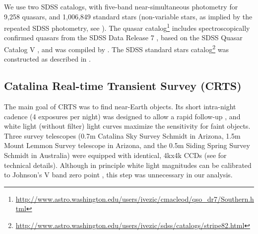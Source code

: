 \documentclass[fleqn,usenatbib]{mnras}
\begin{document}
We use two SDSS catalogs, with five-band near-simultaneous photometry for 9,258  quasars,  and 1,006,849 standard stars
(non-variable stars, as implied by the repeated SDSS photometry, see \citealt{ivezic2007}). 
The quasar catalog\footnote{\url{http://www.astro.washington.edu/users/ivezic/cmacleod/qso_dr7/Southern.html}} includes spectroscopically confirmed quasars from the SDSS Data Release 7 \citep{abazajian2009}, based on the SDSS Quasar Catalog V \citep{schneider2010}, and was compiled by \cite{macleod2012}. The SDSS standard stars
catalog\footnote{\url{http://www.astro.washington.edu/users/ivezic/sdss/catalogs/stripe82.html}} 
was constructed as described in \cite{ivezic2007}.


\subsection{Catalina Real-time Transient Survey (CRTS) \label{sec:crtsdata}}
The main goal of CRTS was to find near-Earth objects. Its short intra-night cadence (4 exposures per
night) was designed to allow a rapid follow-up \citep{graham2015b}, and white light (without filter) 
light curves maximize the sensitivity for faint objects. Three survey telescopes (0.7m Catalina Sky Survey 
Schmidt in Arizona,  1.5m Mount  Lemmon Survey telescope in Arizona, and the 0.5m Siding Spring Survey 
Schmidt in Australia) were equipped with identical, 4kx4k CCDs (see \cite{djorgovski2011a} for technical details).
Although in principle white light magnitudes can be calibrated to Johnson's V band zero point \citep{drake2013},
this step was unnecessary in our analysis. 
\end{document}
